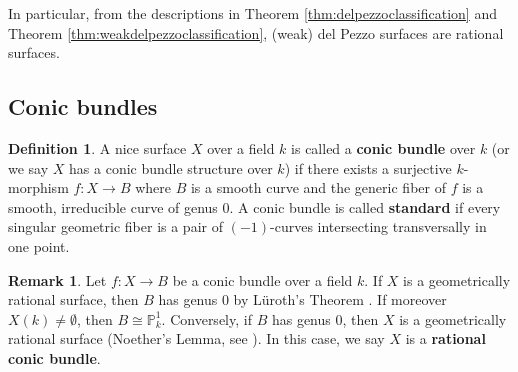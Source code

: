 \documentclass[a4paper, 11pt, reqno]{amsart}
\numberwithin{equation}{section} \numberwithin{figure}{section}
\newcommand{\term}[1]{\textbf{#1}}          %
\def \P {{\mathbb P}}
\newcommand{\ra}{\rightarrow}
\newtheorem{proposition}[lemma]{Proposition}
\theoremstyle{definition}
\newtheorem{definition}[lemma]{Definition}
\newtheorem{remark}[lemma]{Remark}
\numberwithin{lemma}{section}
\begin{document}
In particular, from the descriptions in Theorem \ref{thm:delpezzoclassification} and Theorem \ref{thm:weakdelpezzoclassification}, (weak) del Pezzo surfaces are rational surfaces.

\subsection{Conic bundles}\label{sec:conicbundles}
\begin{definition}
    A nice surface $X$ over a field $k$ is called a \term{conic bundle} over $k$ (or we say $X$ has a conic bundle structure over $k$) if there exists a surjective $k$-morphism $f \colon X \ra B$ where $B$ is a smooth curve and the generic fiber of $f$ is a smooth, irreducible curve of genus 0.
    A conic bundle is called \term{standard} if every singular geometric fiber is a pair of $(-1)$-curves intersecting transversally in one point. 
\end{definition}

\begin{remark}\label{rem:rationalconicbundle}
     Let $f \colon X \ra B$ be a conic bundle over a field $k$. If $X$ is a geometrically rational surface, then $B$ has genus 0 by L\"{u}roth's Theorem \cite{luroth}. If moreover $X(k) \neq \emptyset$, then $B \cong \P^1_{k}$. Conversely, if $B$ has genus 0, then $X$ is a geometrically rational surface (Noether's Lemma, see \cite[Proposition 1(b)]{iskovskih}). In this case, we say $X$ is a \term{rational conic bundle}.
\end{remark}
\end{document}

